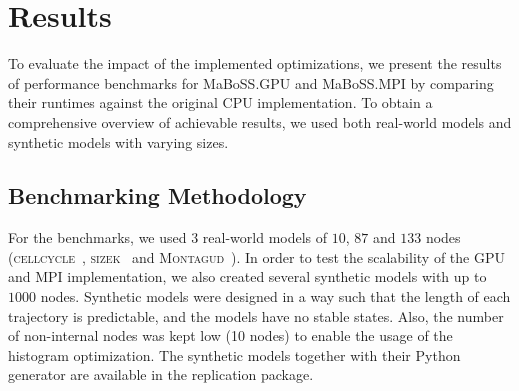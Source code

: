 \documentclass[sn-mathphys-num]{sn-jnl}%
\begin{document}


\section{Results}

To evaluate the impact of the implemented optimizations, we present the results of performance benchmarks for MaBoSS.GPU and MaBoSS.MPI by comparing their runtimes against the original CPU implementation. To obtain a comprehensive overview of achievable results, we used both real-world models and synthetic models with varying sizes.

\subsection{Benchmarking Methodology}

For the benchmarks, we used $3$ real-world models of $10$, $87$ and $133$ nodes (\textsc{cellcycle}~\cite{faure2006cellcycle}, \textsc{sizek}~\cite{sizek2019boolean} and \textsc{Montagud}~\cite{montagud2022prostate}). In order to test the scalability of the GPU and MPI implementation, we also created several synthetic models with up to $1000$ nodes. Synthetic models were designed in a way such that the length of each trajectory is predictable, and the models have no stable states. Also, the number of non-internal nodes was kept low (10 nodes) to enable the usage of the histogram optimization. The synthetic models together with their Python generator are available in the replication package.
\end{document}
